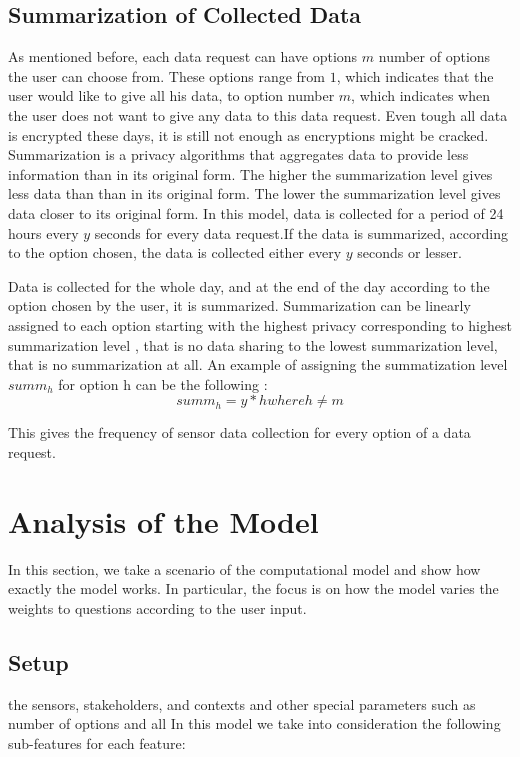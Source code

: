 \subsection{Summarization of Collected Data} \label{summa}
As mentioned before, each data request can have options $m$ number of options the user can choose from. These options range from $1$, which indicates that the user would like to give all his data, to option number $m$, which indicates when the user does not want to give any data to this data request. Even tough all data is encrypted these days, it is still not enough as encryptions might be cracked. Summarization is a privacy algorithms that aggregates data to provide less information than in its original form. The higher the summarization level gives less data than than in its original form. The lower the summarization level gives data closer to its original form. In this model, data is collected for a period of 24 hours every $y$ seconds for every data request.If the data is summarized, according to the option chosen, the data is collected either every $y$ seconds or lesser.

Data is collected for the whole day, and at the end of the day according to the option chosen by the user, it is summarized. Summarization can
be linearly assigned to each option starting with the highest privacy corresponding to highest summarization level , that is no data sharing to
the lowest summarization level, that is no summarization at all. An example of assigning the summatization level $summ_{h}$ for option h can be the following :
\begin{equation}
summ_{h} = y*h where h \neq m
\end{equation}

This gives the frequency of sensor data collection for every option of a data request.

\section{Analysis of the Model} \label{analysis_model}
In this section, we take a scenario of the computational model and show how exactly the model works. In particular, the focus is 
on how the model varies the weights to questions according to the user input.

\subsection{Setup}
the sensors, stakeholders, and contexts and other special parameters such as number of options and all
In this model we take into consideration the following sub-features for each feature:

